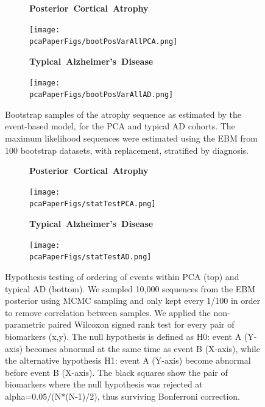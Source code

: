 \begin{figure}
\centering
  \begin{subfigure}{\textwidth}
  \centering
 \textbf{\large{\mbox{Posterior Cortical Atrophy}}}
 
 \texttt{[image: \\pcaPaperFigs/bootPosVarAllPCA.png]}
 \end{subfigure}
 \vspace{1em}
 
 \begin{subfigure}{\textwidth}
  \centering
  \textbf{\large{\mbox{Typical Alzheimer's Disease}}}
  
 \texttt{[image: \\pcaPaperFigs/bootPosVarAllAD.png]}
 \end{subfigure}
 \caption[EBM bootstrap samples of the atrophy sequence for PCA and tAD]{Bootstrap samples of the atrophy sequence as estimated by the event-based model, for the PCA and typical AD cohorts. The maximum likelihood sequences were estimated using the EBM from 100 bootstrap datasets, with replacement, stratified by diagnosis.}
 \label{fig:bootPosVarAllPcaAd}
\end{figure}

\begin{figure}
\centering
  \begin{subfigure}{\textwidth}
  \centering
 \textbf{\large{\mbox{Posterior Cortical Atrophy}}}
 
 \texttt{[image: \\pcaPaperFigs/statTestPCA.png]}
 \end{subfigure}
 \vspace{1em}
 
 \begin{subfigure}{\textwidth}
  \centering
  \textbf{\large{\mbox{Typical Alzheimer's Disease}}}
  
 \texttt{[image: \\pcaPaperFigs/statTestAD.png]}
 \end{subfigure}
 \caption[Hypothesis testing of ordering of events within PCA and tAD]{Hypothesis testing of ordering of events within PCA (top) and typical AD (bottom). We sampled 10,000 sequences from the EBM posterior using MCMC sampling and only kept every 1/100 in order to remove correlation between samples.  We applied the non-parametric paired Wilcoxon signed rank test for every pair of biomarkers (x,y). The null hypothesis is defined as H0: event A (Y-axis) becomes abnormal at the same time as event B (X-axis), while the alternative hypothesis H1: event A (Y-axis) become abnormal before event B (X-axis). The black squares show the pair of biomarkers where the null hypothesis was rejected at alpha=0.05/(N*(N-1)/2), thus surviving Bonferroni correction.}
  \label{fig:statTestPcaAd}
\end{figure}



